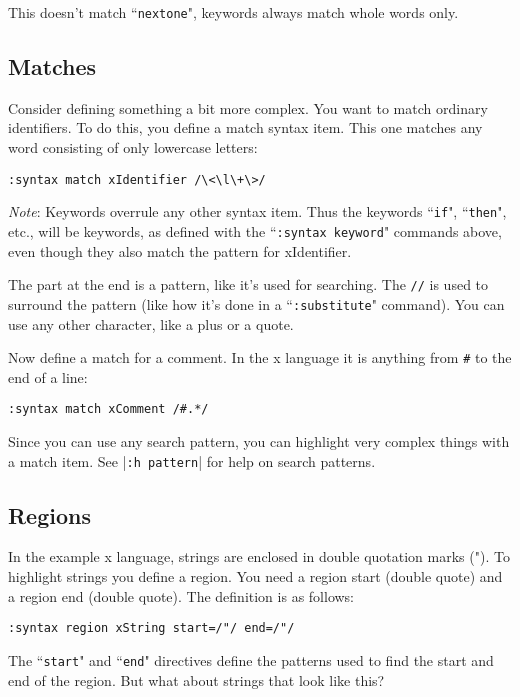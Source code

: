 This doesn't match ``\texttt{nextone}", keywords always match whole words only.
\subsection{Matches}
Consider defining something a bit more complex.
You want to match ordinary identifiers.
To do this, you define a match syntax item.
This one matches any word consisting of only lowercase letters:

\begin{Verbatim}[samepage=true]
 :syntax match xIdentifier /\<\l\+\>/
\end{Verbatim}
 
\emph{Note}: Keywords overrule any other syntax item.
Thus the keywords ``\texttt{if}", ``\texttt{then}", etc., will be keywords, as defined with the ``\texttt{:syntax keyword}" commands above, even though they also match the pattern for xIdentifier.

The part at the end is a pattern, like it's used for searching.
The \texttt{//} is used to surround the pattern (like how it's done in a ``\texttt{:substitute}" command).
You can use any other character, like a plus or a quote.

Now define a match for a comment.
In the x language it is anything from \texttt{\#} to the end of a line:

\begin{Verbatim}[samepage=true]
 :syntax match xComment /#.*/
\end{Verbatim}

Since you can use any search pattern, you can highlight very complex things with a match item.
See |\texttt{:h pattern}| for help on search patterns.
\subsection{Regions}

In the example x language, strings are enclosed in double quotation marks (").
To highlight strings you define a region.
You need a region start (double quote) and a region end (double quote).
The definition is as follows:

\begin{Verbatim}[samepage=true]
 :syntax region xString start=/"/ end=/"/
\end{Verbatim}

The ``\texttt{start}" and ``\texttt{end}" directives define the patterns used to find the start and end of the region.
But what about strings that look like this?

